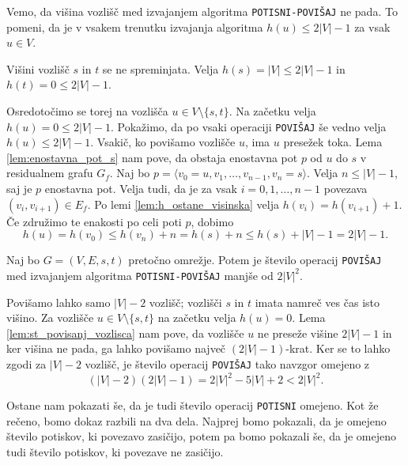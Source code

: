 \documentclass[mat1]{fmfdelo}
\begin{document}
\begin{opomba}
Vemo, da višina vozlišč med izvajanjem algoritma \texttt{POTISNI-POVIŠAJ} ne pada. To pomeni, da je v vsakem trenutku izvajanja algoritma $h(u) \leq 2|V| - 1$ za vsak $u \in V$.
\end{opomba}

\begin{dokaz}
Višini vozlišč $s$ in $t$ se ne spreminjata. Velja $h(s) = |V| \leq 2|V| -1$ in $h(t) = 0 \leq 2|V|-1$.

Osredotočimo se torej na vozlišča $u \in V \setminus \{s,t\}$. Na začetku velja $h(u) = 0 \leq 2|V|-1$. Pokažimo, da po vsaki operaciji \texttt{POVIŠAJ} še vedno velja $h(u) \leq 2|V|-1$. Vsakič, ko povišamo vozlišče $u$, ima $u$ presežek toka. Lema \ref{lem:enostavna_pot_s} nam pove, da obstaja enostavna pot $p$ od $u$ do $s$ v residualnem grafu $G_f$. Naj bo $p = \langle v_0 = u, v_1, \dotsc, v_{n-1}, v_n = s\rangle$. Velja $n \leq |V|-1$, saj je $p$ enostavna pot. Velja tudi, da je za vsak $i = 0,1,\dotsc,n-1$ povezava $(v_i, v_{i+1}) \in E_f$. Po lemi \ref{lem:h_ostane_visinska} velja $h(v_i) = h(v_{i+1}) +1$. Če združimo te enakosti po celi poti $p$, dobimo \[h(u) = h(v_0) \leq h(v_n) + n = h(s) + n \leq h(s) + |V| - 1 = 2|V| - 1.\]
\end{dokaz}

\begin{posledica}\label{pos:om_st_op_povisaj}
Naj bo $G=(V,E,s,t)$ pretočno omrežje. Potem je število operacij \texttt{POVIŠAJ} med izvajanjem algoritma \texttt{POTISNI-POVIŠAJ} manjše od $2|V|^2$.
\end{posledica}

\begin{dokaz}
Povišamo lahko samo $|V| -2$ vozlišč; vozlišči $s$ in $t$ imata namreč ves čas isto višino. Za vozlišče $u \in V \setminus \{s,t\}$ na začetku velja $h(u) = 0$. Lema \ref{lem:st_povisanj_vozlisca} nam pove, da vozlišče $u$ ne preseže višine $2|V| - 1$ in ker višina ne pada, ga lahko povišamo največ $(2|V|-1)$-krat. Ker se to lahko zgodi za $|V|-2$ vozlišč, je število operacij \texttt{POVIŠAJ} tako navzgor omejeno z \[(|V|-2)(2|V|-1) = 2|V|^2 - 5|V| + 2 < 2|V|^2.\]
\end{dokaz}

Ostane nam pokazati še, da je tudi število operacij \texttt{POTISNI} omejeno. Kot že rečeno, bomo dokaz razbili na dva dela. Najprej bomo pokazali, da je omejeno število potiskov, ki povezavo zasičijo, potem pa bomo pokazali še, da je omejeno tudi število potiskov, ki povezave ne zasičijo.
\end{document}
